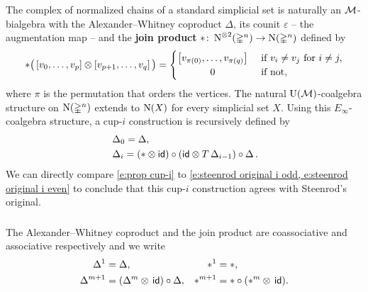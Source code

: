 The complex of normalized chains of a standard simplicial set is naturally an $\mathcal{M}$-bialgebra with the Alexander--Whitney coproduct $\Delta$, its counit $\varepsilon$ -- the augmentation map -- and the \textbf{join product} $\ast \colon \operatorname{N}^{\otimes 2}(\mathbb{\Delta}^n) \to \operatorname{N}(\mathbb{\Delta}^n)$ defined by
\[
\ast \big(\left[v_0, \dots, v_p \right] \ot \left[v_{p+1}, \dots, v_q\right]\big) =
\begin{cases} \left[v_{\pi(0)}, \dots, v_{\pi(q)}\right] & \text{ if } v_i \neq v_j \text{ for } i \neq j, \\
\hfil 0 & \text{ if not}, \end{cases}
\]
where $\pi$ is the permutation that orders the vertices.
The natural ${\operatorname{U}(\mathcal{M})}$-coalgebra structure on $\operatorname{N}(\mathbb{\Delta}^n)$ extends to $\operatorname{N}(X)$ for every simplicial set $X$.
Using this $E_\infty$-coalgebra structure, a \mbox{cup-$i$} construction is recursively defined by
\begin{equation} \label{e:prop cup-i}
\begin{split}
& \operatorname{\Delta}_0 = \operatorname{\Delta}, \\
& \operatorname{\Delta}_i =
(\ast \otimes \mathsf{id}) \circ (\mathsf{id} \otimes T \operatorname{\Delta}_{i-1}) \circ \operatorname{\Delta}.
\end{split}
\end{equation}
We can directly compare \cref{e:prop cup-i} to \cref{e:steenrod original i odd, e:steenrod original i even} to conclude that this \mbox{cup-$i$} construction agrees with Steenrod's original.

\subsubsection{}

The Alexander--Whitney coproduct and the join product are coassociative and associative respectively and we write
\begin{align*}
\Delta^1 &= \Delta, &
\ast^1 &= \ast, \\
\Delta^{m+1} &= (\Delta^m \otimes \, \mathsf{id}) \circ \Delta, &
\ast^{m+1} &= \ast \circ (\ast^m \otimes \, \mathsf{id}).
\end{align*}

